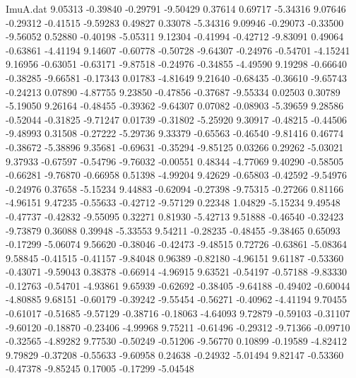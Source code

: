 \begin{filecontents}{ImuA.dat}
   9.05313   -0.39840   -0.29791   -9.50429    0.37614    0.69717   -5.34316
   9.07646   -0.29312   -0.41515   -9.59283    0.49827    0.33078   -5.34316
   9.09946   -0.29073   -0.33500   -9.56052    0.52880   -0.40198   -5.05311
   9.12304   -0.41994   -0.42712   -9.83091    0.49064   -0.63861   -4.41194
   9.14607   -0.60778   -0.50728   -9.64307   -0.24976   -0.54701   -4.15241
   9.16956   -0.63051   -0.63171   -9.87518   -0.24976   -0.34855   -4.49590
   9.19298   -0.66640   -0.38285   -9.66581   -0.17343    0.01783   -4.81649
   9.21640   -0.68435   -0.36610   -9.65743   -0.24213    0.07890   -4.87755
   9.23850   -0.47856   -0.37687   -9.55334    0.02503    0.30789   -5.19050
   9.26164   -0.48455   -0.39362   -9.64307    0.07082   -0.08903   -5.39659
   9.28586   -0.52044   -0.31825   -9.71247    0.01739   -0.31802   -5.25920
   9.30917   -0.48215   -0.44506   -9.48993    0.31508   -0.27222   -5.29736
   9.33379   -0.65563   -0.46540   -9.81416    0.46774   -0.38672   -5.38896
   9.35681   -0.69631   -0.35294   -9.85125    0.03266    0.29262   -5.03021
   9.37933   -0.67597   -0.54796   -9.76032   -0.00551    0.48344   -4.77069
   9.40290   -0.58505   -0.66281   -9.76870   -0.66958    0.51398   -4.99204
   9.42629   -0.65803   -0.42592   -9.54976   -0.24976    0.37658   -5.15234
   9.44883   -0.62094   -0.27398   -9.75315   -0.27266    0.81166   -4.96151
   9.47235   -0.55633   -0.42712   -9.57129    0.22348    1.04829   -5.15234
   9.49548   -0.47737   -0.42832   -9.55095    0.32271    0.81930   -5.42713
   9.51888   -0.46540   -0.32423   -9.73879    0.36088    0.39948   -5.33553
   9.54211   -0.28235   -0.48455   -9.38465    0.65093   -0.17299   -5.06074
   9.56620   -0.38046   -0.42473   -9.48515    0.72726   -0.63861   -5.08364
   9.58845   -0.41515   -0.41157   -9.84048    0.96389   -0.82180   -4.96151
   9.61187   -0.53360   -0.43071   -9.59043    0.38378   -0.66914   -4.96915
   9.63521   -0.54197   -0.57188   -9.83330   -0.12763   -0.54701   -4.93861
   9.65939   -0.62692   -0.38405   -9.64188   -0.49402   -0.60044   -4.80885
   9.68151   -0.60179   -0.39242   -9.55454   -0.56271   -0.40962   -4.41194
   9.70455   -0.61017   -0.51685   -9.57129   -0.38716   -0.18063   -4.64093
   9.72879   -0.59103   -0.31107   -9.60120   -0.18870   -0.23406   -4.99968
   9.75211   -0.61496   -0.29312   -9.71366   -0.09710   -0.32565   -4.89282
   9.77530   -0.50249   -0.51206   -9.56770    0.10899   -0.19589   -4.82412
   9.79829   -0.37208   -0.55633   -9.60958    0.24638   -0.24932   -5.01494
   9.82147   -0.53360   -0.47378   -9.85245    0.17005   -0.17299   -5.04548

\end{filecontents}

